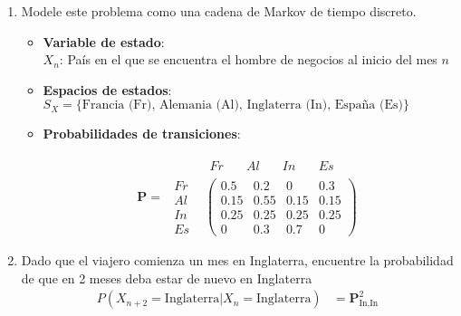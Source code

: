 \begin{enumerate}
    \item Modele este problema como una cadena de Markov de tiempo discreto.

    \begin{itemize}
    	\item[] \textbf{Variable de estado}:\\
    	$X_n$: País en el que se encuentra el hombre de negocios al inicio del mes $n$
    		
    	\item[] \textbf{Espacios de estados}:\\
    	  $S_X = \{\text{Francia (Fr), Alemania (Al), Inglaterra (In), España (Es)} \}$ 

    	\item[] \textbf{Probabilidades de transiciones}:\

            \begin{displaymath}
            \mathbf{P} = \begin{array}{cccc}
                & \begin{array}{cccc} Fr & \quad Al & \quad In & \quad Es \end{array}\\
                \begin{array}{c}  Fr\\Al\\In\\Es \end{array} &  \left( \begin{array}{cccc}
                0.5&0.2&0&0.3\\0.15&0.55&0.15&0.15\\0.25&0.25&0.25&0.25\\0&0.3&0.7&0
                \end{array} \right)  
            \end{array}
            \end{displaymath}

    
    \end{itemize}

    
    \item Dado que el viajero comienza un mes en Inglaterra, encuentre la probabilidad de que en 2 meses deba estar de nuevo en Inglaterra
    \begin{equation*}
    \begin{split}
    P(X_{n+2}= \text{Inglaterra} | X_{n}=\text{Inglaterra}) &= \mathbf{P}_{\text{In},\text{In}}^2\
    \end{split}
    \end{equation*}


\end{enumerate}
